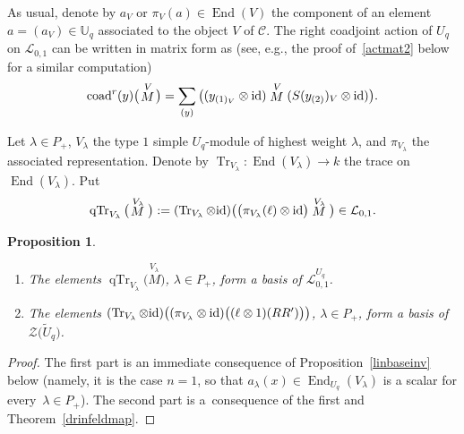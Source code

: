 \documentclass[pdftex]{sigma}%
\numberwithin{equation}{section}
\numberwithin{figure}{section}
\newtheorem{prop}[teo]{Proposition}
\newcommand{\mUq}{\mathbb{U}_q}
\newcommand{\Ll}{{\mathcal L}}
\newcommand{\ra}{\rightarrow}
\begin{document}
\begin{remk}%
As usual, denote by $a_V$ or $\pi_V(a)\in \operatorname{End}(V)$ the component of an element $a=(a_V) \in \mUq$ associated to the object $V$ of $\mathcal{C}$. The right coadjoint action of $U_q$ on $\Ll_{0,1}$ can be written in matrix form as (see, e.g., the proof of~\eqref{actmat2} below for a similar computation)
\begin{equation}\label{actmat}
\operatorname{coad}^r(y)\big(\!\stackrel{V}{M}\!\big) = \sum_{(y)}\big((y_{(1)_V} \otimes {\rm id})\stackrel{V}{M}( S(y_{(2)})_V \otimes {\rm id})\big).
\end{equation}
\end{remk}

Let $\lambda\in P_+$, $V_\lambda$ the type $1$ simple $U_q$-module of highest weight $\lambda$, and $\pi_{V_{\lambda}}$ the associated representation. Denote by $\operatorname{Tr}_{V_{\lambda}}\colon \operatorname{End}(V_{\lambda})\ra k $ the trace on $\operatorname{End}(V_{\lambda}).$ Put
\[\operatorname{qTr}_{V_\lambda}\big(\!\stackrel{V_\lambda}{M}\big) := (\operatorname{Tr}_{V_\lambda}\otimes {\rm id})\big(\big(\pi_{V_{\lambda}}(\ell)\otimes {\rm id}\big)\stackrel{V_\lambda}{M} \big)\in \Ll_{0,1}.\]
\begin{prop} \label{linbasecentre2} \quad
\begin{enumerate}\itemsep=0pt
\item[$1.$] The elements $\operatorname{qTr}_{V_\lambda}\big(\!\stackrel{V_\lambda}{M}\big)$, $\lambda\in P_+$, form a basis of $\Ll_{0,1}^{U_q}$.
\item[$2.$] The elements $(\operatorname{Tr}_{V_\lambda}\otimes {\rm id})\big((\pi_{V_{\lambda}} \otimes {\rm id})\big((\ell\otimes 1)(RR')\big)\big)$, $\lambda\in P_+$, form a basis of $ \mathcal{Z}\big(\tilde{U}_q\big)$.
 \end{enumerate}
\end{prop}

\begin{proof} The first part is an immediate consequence of Proposition~\ref{linbaseinv} below (namely, it is the case $n=1$, so that $a_{\lambda}(x)\in \operatorname{End}_{U_q}(V_{\lambda})$ is a scalar for every~$\lambda\in P_+$). The second part is a~consequence of the first and Theorem~\ref{drinfeldmap}. \end{proof}
\end{document}
